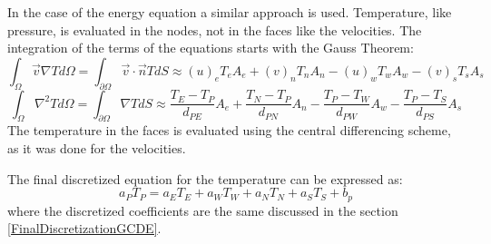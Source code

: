 In the case of the energy equation a similar approach is used. Temperature, like pressure, is evaluated in the nodes, not in the faces like the velocities. The integration of the terms of the equations starts with the Gauss Theorem:
\begin{equation}
\int_{\Omega}\vec{v}\nabla Td\Omega=\int_{\partial\Omega}\vec{v}\cdot\vec{n} TdS\approx\left(u\right)_{e}T_{e}A_{e}+\left(v\right)_{n}T_{n}A_{n}-\left(u\right)_{w}T_{w}A_{w}-\left(v\right)_{s}T_{s}A_{s}
\end{equation}
\begin{equation}
	\int_{\Omega}\nabla^{2}Td\Omega=\int_{\partial\Omega}\nabla TdS\approx\frac{T_{E}-T_{P}}{d_{PE}}A_{e}+\frac{T_{N}-T_{P}}{d_{PN}}A_{n}-\frac{T_{P}-T_{W}}{d_{PW}}A_{w}-\frac{T_{P}-T_{S}}{d_{PS}}A_{s}
\end{equation}
The temperature in the faces is evaluated using the central differencing scheme, as it was done for the velocities.

The final discretized equation for the temperature can be expressed as:
\begin{equation}
a_{P}T_{P}=a_{E}T_{E}+a_{W}T_{W}+a_{N}T_{N}+a_{S}T_{S}+b_{p}
\end{equation}
where the discretized coefficients are the same discussed in the section \ref{FinalDiscretizationGCDE}.

